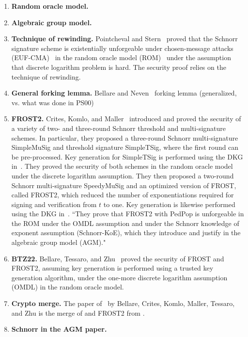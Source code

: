 \begin{enumerate}
\item \textbf{Random oracle model.}
\item \textbf{Algebraic group model.} 
\item \textbf{Technique of rewinding.} Pointcheval and Stern~\cite{PointchevalS00} proved that the Schnorr signature scheme is existentially unforgeable under chosen-message attacks (EUF-CMA)~\cite{GoldwasserMR88} in the random oracle model (ROM)~\cite{BellareR93} under the assumption that discrete logarithm problem is hard. The security proof relies on the technique of rewinding.~
\item \textbf{General forking lemma.} Bellare and Neven~\cite{BellareN06} forking lemma (generalized, vs. what was done in PS00)
\item \textbf{FROST2.} Crites, Komlo, and Maller~\cite{CritesKM21} introduced and proved the security of a variety of two- and three-round Schnorr threshold and multi-signature schemes.  In particular, they proposed a three-round Schnorr multi-signature SimpleMuSig and threshold signature SimpleTSig, where the first round can be pre-processed.  Key generation for SimpleTSig is performed using the DKG in~\cite{KomloG20}.  They proved the security of both schemes in the random oracle model under the discrete logarithm assumption.   They then proposed a two-round Schnorr multi-signature SpeedyMuSig and an optimized version of FROST, called FROST2, which reduced the number of exponentiations required for signing and verification from $t$ to one.  Key generation is likewise performed using the DKG in~\cite{KomloG20}.
``They prove that FROST2 with PedPop is unforgeable in the ROM under the OMDL assumption and under the Schnorr
knowledge of exponent assumption (Schnorr-KoE), which they introduce and justify in the algebraic group model (AGM)."
\item \textbf{BTZ22.} Bellare, Tessaro, and Zhu~\cite{BellareTZ22} proved the security of FROST and FROST2, assuming key generation is performed using a trusted key generation algorithm, under the one-more discrete logarithm assumption (OMDL) in the random oracle model.
\item \textbf{Crypto merge.} The paper of~\cite{BellareCKMTZ22} by Bellare, Crites, Komlo, Maller, Tessaro, and Zhu is the merge of \cite{BellareTZ22} and FROST2 from \cite{CritesKM21}.
\item \textbf{Schnorr in the AGM paper.} 

\end{enumerate}
